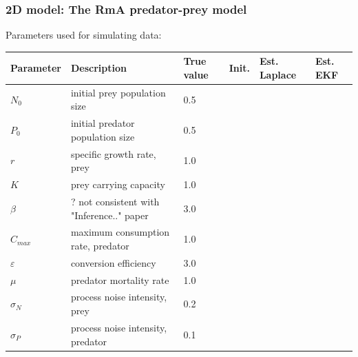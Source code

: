 \begin{frame}
    \frametitle{2D model: The RmA predator-prey model}
    Parameters used for simulating data:
    \begin{table}[]
        \centering
        \begin{tabular}{l l l l l l}
            \toprule
            Parameter & Description & True value & Init. & Est. Laplace & Est. EKF \\
            \midrule
            $N_0$ & initial prey population size & 0.5 \\
            $P_0$ & initial predator population size & 0.5 \\
            $r$ & specific growth rate, prey & 1.0 \\
            $K$ & prey carrying capacity & 1.0 \\
            $\beta$ & ? not consistent with "Inference.." paper & 3.0 \\
            $C_{max}$ & maximum consumption rate, predator & 1.0 \\
            $\varepsilon$ & conversion efficiency & 3.0 \\
            $\mu$ & predator mortality rate & 1.0 \\
            $\sigma_N$ & process noise intensity, prey & 0.2 \\
            $\sigma_P$ & process noise intensity, predator & 0.1 \\
            \bottomrule
        \end{tabular}
    \end{table}
\end{frame}
